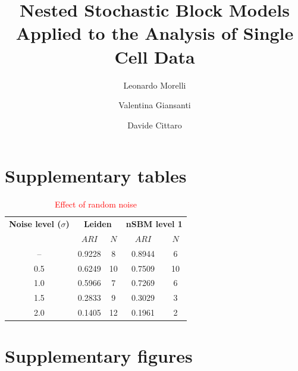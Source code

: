 \documentclass[11pt, titlepage, twoside]{article}
\begin{document}
\title{Nested Stochastic Block Models Applied to the Analysis of Single Cell Data}
\author[1,2]{Leonardo Morelli}
\author[1,3]{Valentina Giansanti}
\author[1]{Davide Cittaro}
\maketitle

\section*{Supplementary tables}
\begin{table}[h!]
\centering
 \begin{tabular}{||c|c c|c c||}
 \hline
\multicolumn{1}{||c|}{\textbf{Noise level ($\sigma$)}} & \multicolumn{2}{c|}{\textbf{Leiden}} & \multicolumn{2}{c||}{\textbf{nSBM level 1}} \\

 & $ARI$ & $N$ & $ARI$ & $N$  \\ 
 \hline\hline
-- & 0.9228 & 8 & 0.8944 & 6 \\
\hline 
0.5 & 0.6249 & 10 & 0.7509  & 10 \\ 
 \hline
 1.0  & 0.5966 & 7 & 0.7269  & 6 \\
 \hline
 1.5  & 0.2833 & 9 &0.3029 & 3 \\
 \hline
 2.0  & 0.1405 & 12 & 0.1961 & 2 \\
 \hline
\end{tabular}
\caption{\textcolor{red}{Effect of random noise }}
\label{Table_Noise}
\end{table}

\clearpage

\section*{Supplementary figures}
\end{document}
